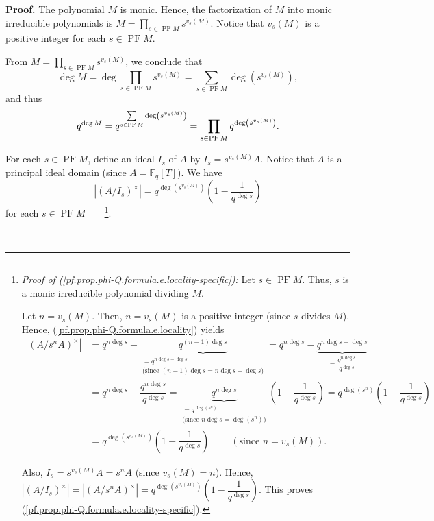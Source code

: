 \documentclass[numbers=enddot,12pt,final,onecolumn,notitlepage]{scrartcl}%
\theoremstyle{definition}
\newenvironment{proof}[1][Proof]{\noindent\textbf{#1.} }{\ \rule{0.5em}{0.5em}}
\let\sumnonlimits\sum
\let\prodnonlimits\prod
\renewcommand{\sum}{\sumnonlimits\limits}
\renewcommand{\prod}{\prodnonlimits\limits}
\begin{document}
\begin{proof}
The polynomial $M$ is monic. Hence, the factorization of $M$ into monic
irreducible polynomials is $M=\prod_{s\in\operatorname*{PF}M}s^{v_{s}\left(
M\right)  }$. Notice that $v_{s}\left(  M\right)  $ is a positive integer for
each $s\in\operatorname*{PF}M$.

From $M=\prod_{s\in\operatorname*{PF}M}s^{v_{s}\left(  M\right)  }$, we
conclude that%
\[
\deg M=\deg\prod_{s\in\operatorname*{PF}M}s^{v_{s}\left(  M\right)  }%
=\sum_{s\in\operatorname*{PF}M}\deg\left(  s^{v_{s}\left(  M\right)  }\right)
,
\]
and thus%
\begin{equation}
q^{\deg M}=q^{\sum_{s\in\operatorname*{PF}M}\deg\left(  s^{v_{s}\left(
M\right)  }\right)  }=\prod\limits_{s\in\operatorname*{PF}M}q^{\deg\left(
s^{v_{s}\left(  M\right)  }\right)  }. \label{pf.prop.phi-Q.formula.e.qdegM}%
\end{equation}


For each $s\in\operatorname*{PF}M$, define an ideal $I_{s}$ of $A$ by
$I_{s}=s^{v_{s}\left(  M\right)  }A$. Notice that $A$ is a principal ideal
domain (since $A=\mathbb{F}_{q}\left[  T\right]  $). We have%
\begin{equation}
\left\vert \left(  A/I_{s}\right)  ^{\times}\right\vert =q^{\deg\left(
s^{v_{s}\left(  M\right)  }\right)  }\left(  1-\dfrac{1}{q^{\deg s}}\right)
\label{pf.prop.phi-Q.formula.e.locality-specific}%
\end{equation}
for each $s\in\operatorname*{PF}M$\ \ \ \ \footnote{\textit{Proof of
(\ref{pf.prop.phi-Q.formula.e.locality-specific}):} Let $s\in
\operatorname*{PF}M$. Thus, $s$ is a monic irreducible polynomial dividing
$M$.
\par
Let $n=v_{s}\left(  M\right)  $. Then, $n=v_{s}\left(  M\right)  $ is a
positive integer (since $s$ divides $M$). Hence,
(\ref{pf.prop.phi-Q.formula.e.locality}) yields
\begin{align*}
\left\vert \left(  A/s^{n}A\right)  ^{\times}\right\vert  &  =q^{n\deg
s}-\underbrace{q^{\left(  n-1\right)  \deg s}}_{\substack{=q^{n\deg s-\deg
s}\\\text{(since }\left(  n-1\right)  \deg s=n\deg s-\deg s\text{)}}}=q^{n\deg
s}-\underbrace{q^{n\deg s-\deg s}}_{=\dfrac{q^{n\deg s}}{q^{\deg s}}}\\
&  =q^{n\deg s}-\dfrac{q^{n\deg s}}{q^{\deg s}}=\underbrace{q^{n\deg s}%
}_{\substack{=q^{\deg\left(  s^{n}\right)  }\\\text{(since }n\deg
s=\deg\left(  s^{n}\right)  \text{)}}}\left(  1-\dfrac{1}{q^{\deg s}}\right)
=q^{\deg\left(  s^{n}\right)  }\left(  1-\dfrac{1}{q^{\deg s}}\right) \\
&  =q^{\deg\left(  s^{v_{s}\left(  M\right)  }\right)  }\left(  1-\dfrac
{1}{q^{\deg s}}\right)  \ \ \ \ \ \ \ \ \ \ \left(  \text{since }%
n=v_{s}\left(  M\right)  \right)  .
\end{align*}
\par
Also, $I_{s}=s^{v_{s}\left(  M\right)  }A=s^{n}A$ (since $v_{s}\left(
M\right)  =n$). Hence, $\left\vert \left(  A/I_{s}\right)  ^{\times
}\right\vert =\left\vert \left(  A/s^{n}A\right)  ^{\times}\right\vert
=q^{\deg\left(  s^{v_{s}\left(  M\right)  }\right)  }\left(  1-\dfrac
{1}{q^{\deg s}}\right)  $. This proves
(\ref{pf.prop.phi-Q.formula.e.locality-specific}).}.


\end{proof}
\end{document}
